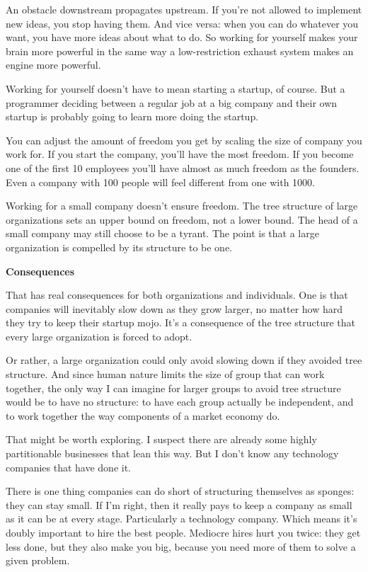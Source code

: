\documentclass[12pt]{book}
\begin{document}
An obstacle downstream propagates upstream. If you're not allowed to
implement new ideas, you stop having them. And vice versa: when you can
do whatever you want, you have more ideas about what to do. So working
for yourself makes your brain more powerful in the same way a
low-restriction exhaust system makes an engine more powerful.

Working for yourself doesn't have to mean starting a startup, of course.
But a programmer deciding between a regular job at a big company and
their own startup is probably going to learn more doing the startup.

You can adjust the amount of freedom you get by scaling the size of
company you work for. If you start the company, you'll have the most
freedom. If you become one of the first 10 employees you'll have almost
as much freedom as the founders. Even a company with 100 people will
feel different from one with 1000.

Working for a small company doesn't ensure freedom. The tree structure
of large organizations sets an upper bound on freedom, not a lower
bound. The head of a small company may still choose to be a tyrant. The
point is that a large organization is compelled by its structure to be
one.

\textbf{Consequences}

That has real consequences for both organizations and individuals. One
is that companies will inevitably slow down as they grow larger, no
matter how hard they try to keep their startup mojo. It's a consequence
of the tree structure that every large organization is forced to adopt.

Or rather, a large organization could only avoid slowing down if they
avoided tree structure. And since human nature limits the size of group
that can work together, the only way I can imagine for larger groups to
avoid tree structure would be to have no structure: to have each group
actually be independent, and to work together the way components of a
market economy do.

That might be worth exploring. I suspect there are already some highly
partitionable businesses that lean this way. But I don't know any
technology companies that have done it.

There is one thing companies can do short of structuring themselves as
sponges: they can stay small. If I'm right, then it really pays to keep
a company as small as it can be at every stage. Particularly a
technology company. Which means it's doubly important to hire the best
people. Mediocre hires hurt you twice: they get less done, but they also
make you big, because you need more of them to solve a given problem.
\end{document}
